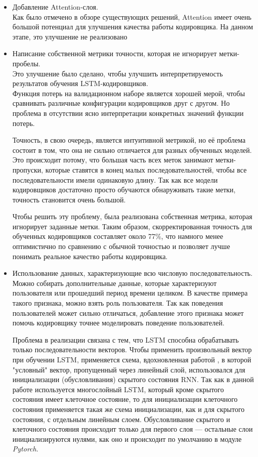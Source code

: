 \begin{itemize}
	\item Добавление Attention-слоя.\\
	Как было отмечено в обзоре существующих решений, Attention имеет очень большой потенциал для улучшения качества работы кодировщика. На данном этапе, это улучшение не реализовано\\
	\item Написание собственной метрики точности, которая не игнорирует метки-пробелы.\\
	Это улучшение было сделано, чтобы улучшить интерпретируемость результатов обучения LSTM-кодировщиков.\\
	Функция потерь на валидационном наборе является хорошей мерой, чтобы сравнивать различные конфигурации кодировщиков друг с другом. Но проблема в отсутствии ясно интерпретации конкретных значений функции потерь.
	
	Точность, в свою очередь, является интуитивной метрикой, но её проблема состоит в том, что она не сильно отличается для разных обученных моделей. Это происходит потому, что большая часть всех меток занимают метки-пропуски, которые ставятся в конец малых последовательностей, чтобы все последовательности имели одинаковую длину. Так как все модели кодировщиков достаточно просто обучаются обнаруживать такие метки, точность становится очень большой.
	
	Чтобы решить эту проблему, была реализована собственная метрика, которая игнорирует заданные метки. Таким образом, скорректированная точность для обученных кодировщиков составляет около 77\%, что намного менее оптимистично по сравнению с обычной точностью и позволяет лучше понимать реальное качество работы кодировщика.\\
	
	\item Использование данных, характеризующие всю числовую последовательность.\\
	
	Можно собирать дополнительные данные, которые характеризуют пользователя или прошедший период времени целиком. В качестве примера такого признака, можно взять роль пользователя. Так как поведения пользователей может сильно отличаться, добавление этого признака может помочь кодировщику точнее моделировать поведение пользователей.
	
	Проблема в реализации связана с тем, что LSTM способна обрабатывать только последовательности векторов. Чтобы применить произвольный вектор при обучении LSTM, применяется схема, вдохновленная работой \cite{karpathyDeepVisualSemanticAlignments2015}, в которой "условный" вектор, пропущенный через линейный слой, использовался для инициализации (обусловливания) скрытого состояния RNN. Так как в данной работе используется многослойный LSTM, который кроме скрытого состояния имеет клеточное состояние, то для инициализации клеточного состояния применяется такая же схема инициализации, как и для скрытого состояния, с отдельным линейным слоем. Обусловливание скрытого и клеточного состояния происходит только для первого слоя --- остальные слои инициализируются нулями, как оно и происходит по умолчанию в модуле \textit{Pytorch}.


\end{itemize}

